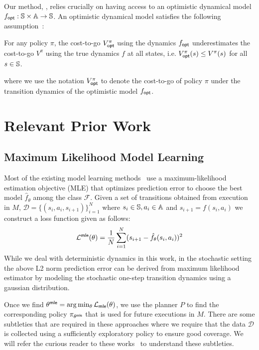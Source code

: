 Our method, \taml{}, relies crucially on having access to an
optimistic dynamical model $f_\mathsf{opt}: \mathbb{S} \times \mathbb{A}
\rightarrow \mathbb{S}$. An optimistic dynamical model satisfies
the following assumption~\cite{cmaxpp}:
\begin{assumption}
  For any policy $\pi$, the cost-to-go $V^\pi_{\mathsf{opt}}$ using the dynamics
  $f_\mathsf{opt}$ underestimates the cost-to-go $V^\pi$ using the true
  dynamics $f$ at all states, i.e. $V^\pi_{\mathsf{opt}}(s) \leq V^\pi(s)$ for
  all $s \in \mathbb{S}$.
  \label{assumption:taml-optimistic}
\end{assumption}
where we use the notation $V_{\mathsf{opt}}^\pi$ to denote the cost-to-go of
policy $\pi$ under the transition dynamics of the optimistic model
$f_\mathsf{opt}$.

\section{Relevant Prior Work}
\label{sec:prior-work}

\subsection{Maximum Likelihood Model Learning}
\label{sec:maxim-likel-model}

Most of the existing model learning
methods~\cite{DBLP:journals/arc/Ljung10, DBLP:conf/icml/AbbeelN05,
  DBLP:conf/icml/RossB12,  DBLP:journals/corr/abs-1907-02057} use a maximum-likelihood
estimation objective (MLE) that optimizes prediction error to choose the best
model $\hat{f}_\theta$ among the class $\mathcal{F}$. Given a set of
transitions obtained from execution in $M$, $\mathcal{D} = \{(s_i, a_i,
s_{i+1})\}_{i=1}^N$ where $s_i \in \mathbb{S}, a_i \in \mathbb{A}$
and $s_{i+1} = f(s_i, a_i)$ we construct a loss function 
given as follows:
\begin{equation}
  \label{eq:21}
  \mathcal{L}^{\mathsf{mle}}(\theta) = \frac{1}{N} \sum_{i=1}^{N} (s_{i+1} -
  \hat{f}_\theta(s_i, a_i))^2
\end{equation}
While we deal with deterministic dynamics in this work, in the
stochastic setting the above L2 norm prediction error can be derived
from maximum likelihood estimator by modeling the stochastic one-step
transition dynamics using a gaussian distribution.

Once we find $\theta^{\mathsf{mle}} = \arg\min_{\theta}
\mathcal{L}_{\mathsf{mle}}(\theta)$, we use the planner $P$ to find the
corresponding policy $\pi_{\theta^{\mathsf{mle}}}$ that is used for future
executions in $M$. There are some subtleties that are required in
these approaches where we require that the data $\mathcal{D}$ is
collected using a sufficiently exploratory policy to ensure good
coverage. We will refer the curious reader to these works~\cite{DBLP:journals/arc/Ljung10, DBLP:conf/icml/AbbeelN05,
  DBLP:conf/icml/RossB12,  DBLP:journals/corr/abs-1907-02057} to
understand these subtleties.

